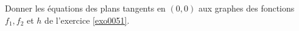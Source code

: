 
\begin{exercice}\label{exo0052}

Donner les équations des plans tangents en $(0,0)$ aux graphes des fonctions $f_1, f_2$ et $h$  de l'exercice \ref{exo0051}.

\end{exercice}
